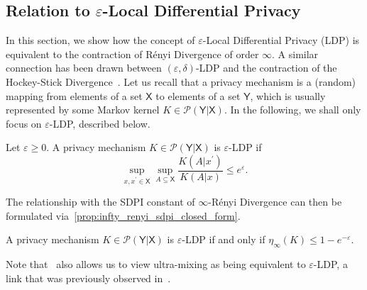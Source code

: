 \documentclass[conference,letterpaper]{IEEEtran}
\def \X{\mathsf X}
\def \Y{\mathsf Y}
\def \calP{\mathcal P}
\def \supp {\mathrm{supp}}
\begin{document}
\subsection{Relation to $\varepsilon$-Local Differential Privacy}\noindent
In this section, we show how the concept of $\varepsilon$-Local Differential Privacy (LDP) is equivalent to the contraction of R\'enyi Divergence of order $\infty$. A similar connection has been drawn between $(\varepsilon, \delta)$-LDP and the contraction of the Hockey-Stick Divergence~\cite{asoodeh2020contraction}. Let us recall that a privacy mechanism is a (random) mapping from elements of a set $\X$ to elements of a set $\Y$, which is usually represented by some Markov kernel $K\in\calP(\Y|\X)$. In the following, we shall only focus on $\varepsilon$-LDP, described below.
\begin{definition}
    Let $\varepsilon\geq 0$. A privacy mechanism $K\in\calP(\Y|\X)$ is $\varepsilon$-LDP if
    \begin{equation*}
        \sup_{x, x^\prime\in\X}\sup_{A\subseteq\X}\frac{K(A|x^\prime)}{K(A|x)}\leq e^\varepsilon.
    \end{equation*}
\end{definition}
The relationship with the SDPI constant of $\infty$-R\'enyi Divergence can then be formulated via~\cref{prop:infty_renyi_sdpi_closed_form}.
\begin{corollary}
    A privacy mechanism $K\in\calP(\Y|\X)$ is $\varepsilon$-LDP if and only if $\eta_\infty(K)\leq 1-e^{-\varepsilon}$.
\end{corollary}
Note that~ also allows us to view ultra-mixing as being equivalent to $\varepsilon$-LDP, a link that was previously observed in~\cite[Table 1]{balle2019privacy}.
\end{document}
